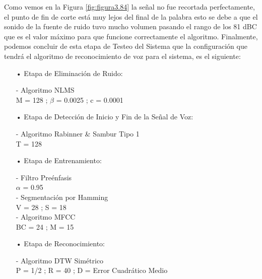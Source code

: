 \vskip -1.0cm
Como vemos en la Figura \ref{fig:figura3.84} la señal no fue recortada perfectamente, el punto de fin de corte está muy lejos del final de la palabra esto se debe a que el sonido de la fuente de ruido tuvo mucho volumen pasando el rango de los 81 dBC que es el valor máximo para que funcione correctamente el algoritmo. Finalmente, podemos concluir de esta etapa de Testeo del Sistema que la configuración que tendrá el algoritmo de reconocimiento de voz para el sistema, es el siguiente:

\newpage
\begin{enumerate}

\item[•]Etapa de Eliminación de Ruido: 
\par
\hspace*{1cm} - Algoritmo NLMS \\
\hspace*{2cm} M = 128 ; \qquad $\beta$ = 0.0025 ; \qquad c = 0.0001

\item[•]Etapa de Detección de Inicio y Fin de la Señal de Voz: 
\par
\hspace*{1cm} - Algoritmo Rabinner \& Sambur Tipo 1 \\
\hspace*{2cm} T = 128

\item[•]Etapa de Entrenamiento: 
\par
\hspace*{1cm} - Filtro Preénfasis \\
\hspace*{2cm} $\alpha$ = 0.95 \\
\hspace*{1cm} - Segmentación por Hamming \\
\hspace*{2cm} V = 28 ; \qquad S = 18 \\
\hspace*{1cm} - Algoritmo MFCC \\
\hspace*{2cm} BC = 24 ; \qquad M = 15

\item[•]Etapa de Reconocimiento: 
\par
\hspace*{1cm} - Algoritmo DTW Simétrico \\
\hspace*{2cm} P = 1/2 ; \qquad R = 40 ; \qquad D = Error Cuadrático Medio \\

\end{enumerate}

